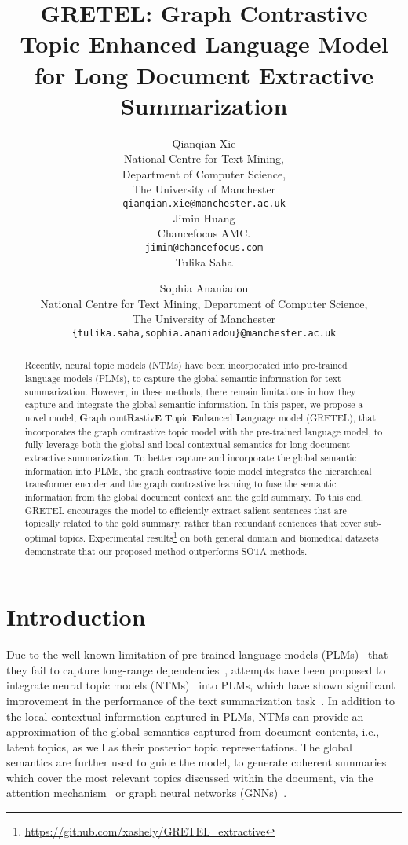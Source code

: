 \documentclass[11pt]{article}
\title{GRETEL: Graph Contrastive Topic Enhanced Language Model for Long Document Extractive Summarization}
\author{Qianqian Xie \\
  National Centre for Text Mining,\\ Department of Computer Science,\\ The University of Manchester\\
  \texttt{qianqian.xie@manchester.ac.uk} \\
  \And
  Jimin Huang \\
  Chancefocus AMC. \\
  \texttt{jimin@chancefocus.com} \\
  \AND
  Tulika Saha \and Sophia Ananiadou\\
  National Centre for Text Mining, Department of Computer Science,\\ The University of Manchester\\
  \texttt{\{tulika.saha,sophia.ananiadou\}@manchester.ac.uk} \\
  }
\begin{document}
\maketitle
\begin{abstract}
Recently, neural topic models (NTMs) have been incorporated into pre-trained language models (PLMs), to capture the global semantic information for text summarization.
However, in these methods, there remain limitations in how they capture and integrate the global semantic information.
In this paper, we propose a novel model, \textbf{G}raph cont\textbf{R}astiv\textbf{E} \textbf{T}opic \textbf{E}nhanced \textbf{L}anguage model (GRETEL), that incorporates the graph contrastive topic model with the pre-trained language model, to fully leverage both the global and local contextual semantics for long document extractive summarization.
To better capture and incorporate the global semantic information into PLMs, the graph contrastive topic model integrates the hierarchical transformer encoder and the graph contrastive learning to fuse the semantic information from the global document context and the gold summary.
To this end, GRETEL encourages the model to efficiently extract salient sentences that are topically related to the gold summary, rather than redundant sentences that cover sub-optimal topics.
Experimental results\footnote{\url{https://github.com/xashely/GRETEL\_extractive}} on both general domain and biomedical datasets demonstrate that our proposed method outperforms SOTA methods.
\end{abstract}

\section{Introduction}
Due to the well-known limitation of pre-trained language models (PLMs)~\cite{devlin2019bert,wang2021pre} that they fail to capture long-range dependencies~\cite{beltagy2020longformer}, attempts have been proposed to integrate neural topic models (NTMs)~\cite{cao2015novel,peng2018neural,xie2021graph} into PLMs, which have shown significant improvement in the performance of the text summarization task~\cite{wang2020friendly, cui2021topic, nguyen2021enriching, fu2020document}.
In addition to the local contextual information captured in PLMs, NTMs can provide an approximation of the global semantics captured from document contents, i.e., latent topics, as well as their posterior topic representations.
The global semantics 
are further used to guide the model, to generate coherent summaries which cover the most relevant topics discussed within the document, via the attention mechanism~\cite{wang2020friendly, aralikatte2021focus, nguyen2021enriching, fu2020document} or graph neural networks (GNNs)~\cite{cui2021topic, cui2020enhancing}. 
\end{document}
